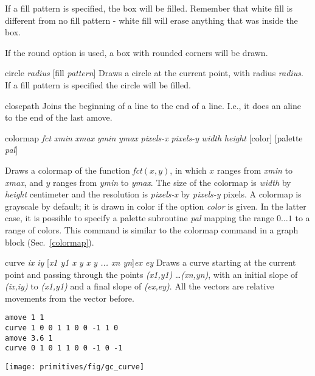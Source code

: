 \begin{commanddescription}
If a fill pattern is specified, the box will be filled.
Remember that white fill is different from no fill pattern - white fill will
erase anything that was inside the box.

If the {\sf round} option is used, a box with rounded corners will be drawn.

\item[{\sf circle {\it radius} [fill {\it pattern}]} ]
  Draws a circle at the current point,
with radius {\it radius}.  If a fill
pattern is specified the circle will be filled.

\item[{\sf closepath }]
Joins the beginning of a line to the end of a line. I.e., it does an {\sf aline}
to the end of the last {\sf amove}.

\item[{\sf colormap {\it fct} {\it xmin} {\it xmax} {\it ymin} {\it ymax} {\it pixels-x} {\it pixels-y} {\it width} {\it height} [color] [palette {\it pal}]}]

Draws a colormap of the function {\it fct}$(x,y)$, in which $x$ ranges from {\it xmin} to {\it xmax}, and $y$ ranges from {\it ymin} to {\it ymax}. The size of the colormap is {\it width} by {\it height} centimeter and the resolution is {\it pixels-x} by {\it pixels-y} pixels. A colormap is grayscale by default; it is drawn in color if the option {\it color} is given. In the latter case, it is possible to specify a palette subroutine {\it pal} mapping the range $0 \ldots 1$ to a range of colors. This command is similar to the colormap command in a graph block (Sec.~\ref{colormap}).

\item[{\sf curve {\it ix iy }[{\it x1 y1 x y x y ... xn yn}]{\it ex ey }}  ]
 Draws a curve starting at the current point and passing through the points
{\it (x1,y1)} \ldots {\it (xn,yn)}, with an initial slope of {\it (ix,iy)} to
{\it (x1,y1)} and a final slope of {\it (ex,ey)}. All the vectors are
relative movements from the vector before.

\begin{minipage}[c]{8cm}
\begin{Verbatim}
amove 1 1
curve 1 0 0 1 1 0 0 -1 1 0
amove 3.6 1
curve 0 1 0 1 1 0 0 -1 0 -1
\end{Verbatim}
\end{minipage}
\hfill
\begin{minipage}[c]{7cm}
\mbox{\texttt{[image: primitives/fig/gc\_curve]}}
\end{minipage}


\end{commanddescription}
